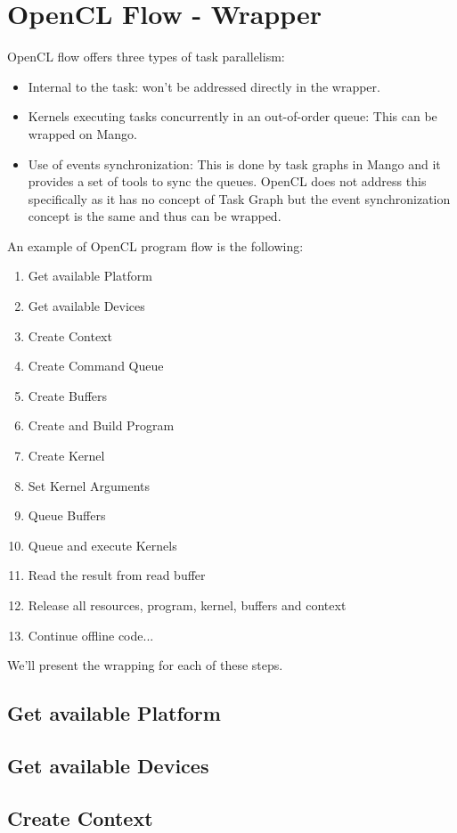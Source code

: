 \documentclass[a4paper]{article}
\begin{document}
\section{OpenCL Flow - Wrapper}
OpenCL flow offers three types of task parallelism: 
\begin{itemize}
	\item Internal to the task: won't be addressed directly in the wrapper.
	\item Kernels executing tasks concurrently in an out-of-order queue: This can be wrapped on Mango.
	\item Use of events synchronization: This is done by task graphs in Mango and it provides a set of tools to sync the queues. OpenCL does not address this specifically as it has no concept of Task Graph but the event synchronization concept is the same and thus can be wrapped.
\end{itemize} 
 An example of OpenCL program flow is the following:
\begin{enumerate}
	\item Get available Platform
        	\item Get available Devices
	\item Create Context
	\item Create Command Queue
	\item Create Buffers
	\item Create and Build Program
	\item Create Kernel
	\item Set Kernel Arguments
	\item Queue Buffers
	\item Queue and execute Kernels
	\item Read the result from read buffer
	\item Release all resources, program, kernel, buffers and context
	\item Continue offline code... 
\end{enumerate}
We'll present the wrapping for each of these steps.

\subsection{Get available Platform}
\subsection{Get available Devices}
\subsection{Create Context}
\end{document}
